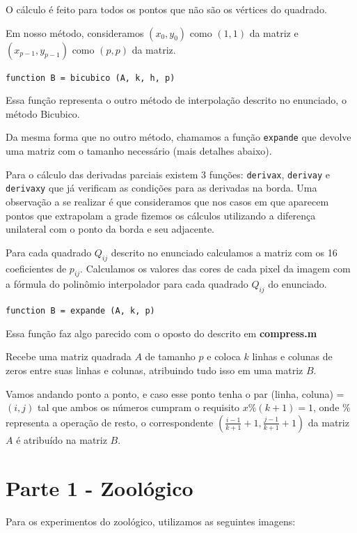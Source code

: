 \documentclass[12pt,letterpaper]{article}
\begin{document}
	O cálculo é feito para todos os pontos que não são os vértices do quadrado. 
	
	Em nosso método, consideramos $(x_0, y_0)$ como $(1, 1)$ da matriz e $(x_{p-1}, y_{p-1})$ como $(p, p)$ da matriz.
	 
	\begin{center}
		\texttt{function B = bicubico (A, k, h, p)}
	\end{center}

	Essa função representa o outro método de interpolação descrito no enunciado, o método Bicubico.

	Da mesma forma que no outro método, chamamos a função \texttt{expande} que devolve uma matriz com o tamanho necessário (mais detalhes abaixo).

	Para o cálculo das derivadas parciais existem 3 funções: \texttt{derivax}, \texttt{derivay} e \texttt{derivaxy} que já verificam as condições para as derivadas na borda. Uma observação a se realizar é que consideramos que nos casos em que aparecem pontos que extrapolam a grade fizemos os cálculos utilizando a diferença unilateral com o ponto da borda e seu adjacente.

	Para cada quadrado $Q_{ij}$ descrito no enunciado calculamos a matriz com os 16 coeficientes de $p_{ij}$. Calculamos os valores das cores de cada pixel da imagem com a fórmula do polinômio interpolador para cada quadrado $Q_{ij}$ do enunciado.

	\begin{center}
		\texttt{function B = expande (A, k, p)}
	\end{center}
	
	Essa função faz algo parecido com o oposto do descrito em \textbf{compress.m}
	
	Recebe uma matriz quadrada $A$ de tamanho $p$ e coloca $k$ linhas e colunas de zeros entre suas linhas e colunas, atribuindo tudo isso em uma matriz $B$. 
	
	Vamos andando ponto a ponto, e caso esse ponto tenha o par (linha, coluna) = $(i, j)$ tal que ambos os números cumpram o requisito $x\%(k+1)=1$, onde $\%$ representa a operação de resto, o correspondente $(\frac{i-1}{k+1}+1, \frac{j-1}{k+1}+1)$ da matriz $A$ é atribuído na matriz $B$.
	
	\section{Parte 1 - Zoológico}
	
	Para os experimentos do zoológico, utilizamos as seguintes imagens: 
	
\end{document}
